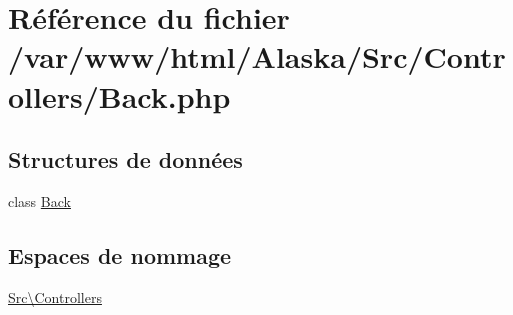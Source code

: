 \hypertarget{_back_8php}{}\section{Référence du fichier /var/www/html/\+Alaska/\+Src/\+Controllers/\+Back.php}
\label{_back_8php}
\subsection*{Structures de données}
\begin{DoxyCompactItemize}
\item 
class \hyperlink{class_src_1_1_controllers_1_1_back}{Back}
\end{DoxyCompactItemize}
\subsection*{Espaces de nommage}
\begin{DoxyCompactItemize}
\item 
 \hyperlink{namespace_src_1_1_controllers}{Src\textbackslash{}\+Controllers}
\end{DoxyCompactItemize}
